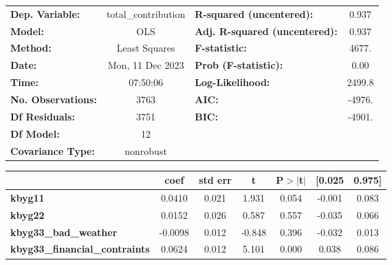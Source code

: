 \begin{center}
\begin{tabular}{lclc}
\toprule
\textbf{Dep. Variable:}                      & total\_contribution & \textbf{  R-squared (uncentered):}      &     0.937   \\
\textbf{Model:}                              &         OLS         & \textbf{  Adj. R-squared (uncentered):} &     0.937   \\
\textbf{Method:}                             &    Least Squares    & \textbf{  F-statistic:       }          &     4677.   \\
\textbf{Date:}                               &   Mon, 11 Dec 2023  & \textbf{  Prob (F-statistic):}          &     0.00    \\
\textbf{Time:}                               &       07:50:06      & \textbf{  Log-Likelihood:    }          &    2499.8   \\
\textbf{No. Observations:}                   &          3763       & \textbf{  AIC:               }          &    -4976.   \\
\textbf{Df Residuals:}                       &          3751       & \textbf{  BIC:               }          &    -4901.   \\
\textbf{Df Model:}                           &            12       & \textbf{                     }          &             \\
\textbf{Covariance Type:}                    &      nonrobust      & \textbf{                     }          &             \\
\bottomrule
\end{tabular}
\begin{tabular}{lcccccc}
                                             & \textbf{coef} & \textbf{std err} & \textbf{t} & \textbf{P$> |$t$|$} & \textbf{[0.025} & \textbf{0.975]}  \\
\midrule
\textbf{kbyg11}                              &       0.0410  &        0.021     &     1.931  &         0.054        &       -0.001    &        0.083     \\
\textbf{kbyg22}                              &       0.0152  &        0.026     &     0.587  &         0.557        &       -0.035    &        0.066     \\
\textbf{kbyg33\_bad\_weather}                &      -0.0098  &        0.012     &    -0.848  &         0.396        &       -0.032    &        0.013     \\
\textbf{kbyg33\_financial\_contraints}       &       0.0624  &        0.012     &     5.101  &         0.000        &        0.038    &        0.086     \\

\end{tabular}
\end{center}
